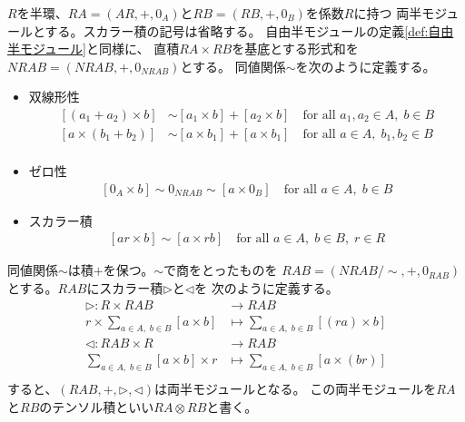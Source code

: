 	\begin{definition}[半モジュールのテンソル積]\label{def:半モジュールのテンソル積} %
		$R$を半環、$RA=(AR,+,0_A)$と$RB=(RB,+,0_B)$を係数$R$に持つ
		両半モジュールとする。スカラー積の記号は省略する。
		自由半モジュールの定義\ref{def:自由半モジュール}と同様に、
		直積$RA\times RB$を基底とする形式和を$NRAB=(NRAB,+,0_{NRAB})$とする。
		同値関係$\sim$を次のように定義する。
		\begin{itemize}
			\item 双線形性
			\begin{equation}\begin{split} %
				[(a_1+a_2)\times b] &\sim [a_1\times b] + [a_2\times b] \quad\text{for all }a_1,a_2\in A,\;b\in B \\
				[a\times (b_1+b_2)] &\sim [a\times b_1] + [a\times b_1] \quad\text{for all }a\in A,\;b_1,b_2\in B \\
			\end{split}\end{equation} %
			\item ゼロ性
			\begin{equation}\begin{split} %
				[0_A\times b] \sim 0_{NRAB} \sim [a\times 0_B] \quad\text{for all }a\in A,\;b\in B
			\end{split}\end{equation} %
			\item スカラー積
			\begin{equation}\begin{split} %
				[ar\times b] \sim [a\times rb] \quad\text{for all }a\in A,\;b\in B,\;r\in R
			\end{split}\end{equation} %
		\end{itemize}
		同値関係$\sim$は積$+$を保つ。$\sim$で商をとったものを
		$RAB=(NRAB/\sim,+,0_{RAB})$とする。$RAB$にスカラー積$\rhd$と$\lhd$を
		次のように定義する。
		\begin{equation}\begin{split} %
			\rhd: R\times RAB &\to RAB \\
				r\times \sum_{a\in A,\;b\in B}[a\times b]
					&\mapsto \sum_{a\in A,\;b\in B}[(ra)\times b] \\
			\lhd: RAB\times R &\to RAB \\
				\sum_{a\in A,\;b\in B}[a\times b]\times r
					&\mapsto \sum_{a\in A,\;b\in B}[a\times (br)] \\
		\end{split}\end{equation} %
		すると、$(RAB,+,\rhd,\lhd)$は両半モジュールとなる。
		この両半モジュールを$RA$と$RB$のテンソル積といい$RA\otimes RB$と書く。
	\end{definition} %

